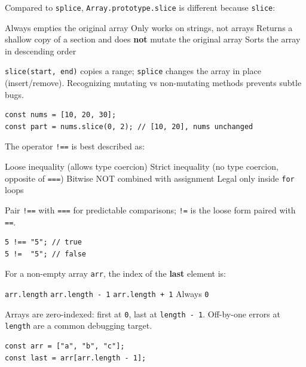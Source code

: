 \question[4]
Compared to \texttt{splice}, \texttt{Array.prototype.slice} is different because \texttt{slice}:
\begin{choices}
  \choice Always empties the original array
  \choice Only works on strings, not arrays
  \CorrectChoice Returns a shallow copy of a section and does \textbf{not} mutate the original array
  \choice Sorts the array in descending order
\end{choices}
\begin{solution}
  \texttt{slice(start, end)} copies a range; \texttt{splice} changes the array in place (insert/remove). Recognizing mutating vs non-mutating methods prevents subtle bugs.
\begin{lstlisting}[style=js]
const nums = [10, 20, 30];
const part = nums.slice(0, 2); // [10, 20], nums unchanged
\end{lstlisting}
\end{solution}

\question[4]
The operator \texttt{!==} is best described as:
\begin{choices}
  \choice Loose inequality (allows type coercion)
  \CorrectChoice Strict inequality (no type coercion, opposite of \texttt{===})
  \choice Bitwise NOT combined with assignment
  \choice Legal only inside \texttt{for} loops
\end{choices}
\begin{solution}
  Pair \texttt{!==} with \texttt{===} for predictable comparisons; \texttt{!=} is the loose form paired with \texttt{==}.
\begin{lstlisting}[style=js]
5 !== "5"; // true
5 !=  "5"; // false
\end{lstlisting}
\end{solution}

\question[4]
For a non-empty array \texttt{arr}, the index of the \textbf{last} element is:
\begin{choices}
  \choice \texttt{arr.length}
  \CorrectChoice \texttt{arr.length - 1}
  \choice \texttt{arr.length + 1}
  \choice Always \texttt{0}
\end{choices}
\begin{solution}
  Arrays are zero-indexed: first at \texttt{0}, last at \texttt{length - 1}. Off-by-one errors at \texttt{length} are a common debugging target.
\begin{lstlisting}[style=js]
const arr = ["a", "b", "c"];
const last = arr[arr.length - 1];
\end{lstlisting}
\end{solution}

